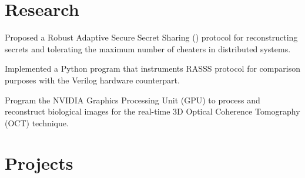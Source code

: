 \documentclass[]{deedy_format_Hien}
\begin{document}
\begin{minipage}[t]{0.66\textwidth}

\section{Research}
\vspace{-0.5mm} %
\vspace{\topsep} %
\justify
\begin{tightemize}
\item Proposed a Robust Adaptive Secure Secret Sharing () protocol for reconstructing secrets and tolerating the maximum number of cheaters in distributed systems.
\item Implemented a Python program that instruments RASSS protocol for comparison purposes with the Verilog hardware counterpart.
\end{tightemize}
\vspace{\topsep}
\sectionsep

\vspace{-0.5mm} %
\vspace{\topsep} %
\justify
\begin{tightemize}
\item Program the NVIDIA Graphics Processing Unit (GPU) to process and reconstruct biological images for the real-time 3D Optical Coherence Tomography (OCT) technique. 
\end{tightemize}
\vspace{\topsep}
\sectionsep


\section{Projects}
\vspace{0.5mm} %



\end{minipage}
\end{document}
